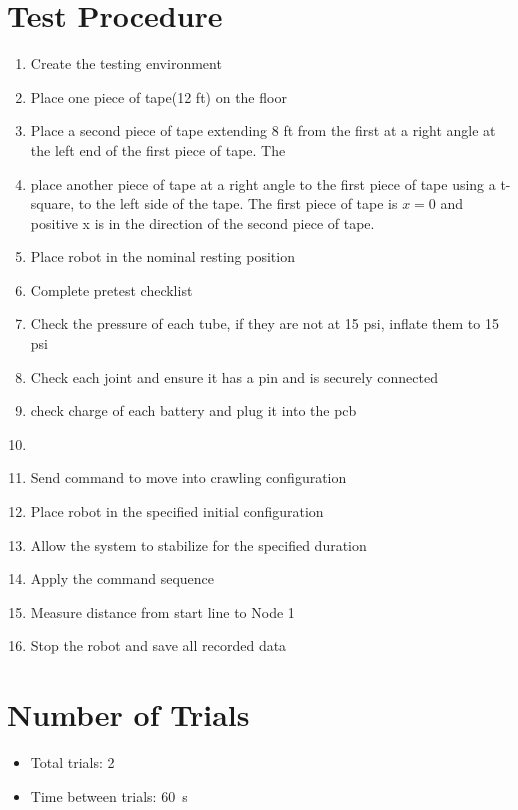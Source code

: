 \documentclass[11pt]{article}
\begin{document}
\section*{Test Procedure}
\begin{enumerate}[noitemsep]
    \item Create the testing environment
        \item Place one piece of tape(12 ft) on the floor
        \item Place a second piece of tape extending 8 ft from the first at a right angle at the left end of the first piece of tape. The 
        \item place another piece of tape at a right angle to the first piece of tape using a t-square, to the left side of the tape. The first piece of tape is $x=0$ and positive x is in the direction of the second piece of tape.
    \item Place robot in the nominal resting position
    \item Complete pretest checklist
        \item Check the pressure of each tube, if they are not at 15 psi, inflate them to 15 psi
        \item Check each joint and ensure it has a pin and is securely connected
        \item check charge of each battery and plug it into the pcb
        \item
    \item Send command to move into crawling configuration
    \item Place robot in the specified initial configuration
    \item Allow the system to stabilize for the specified duration
    \item Apply the command sequence
    \item Measure distance from start line to Node 1
    \item Stop the robot and save all recorded data
\end{enumerate}

\section*{Number of Trials}
\begin{itemize}[noitemsep]
    \item Total trials: 2
    \item Time between trials: 60~s
\end{itemize}
\end{document}
